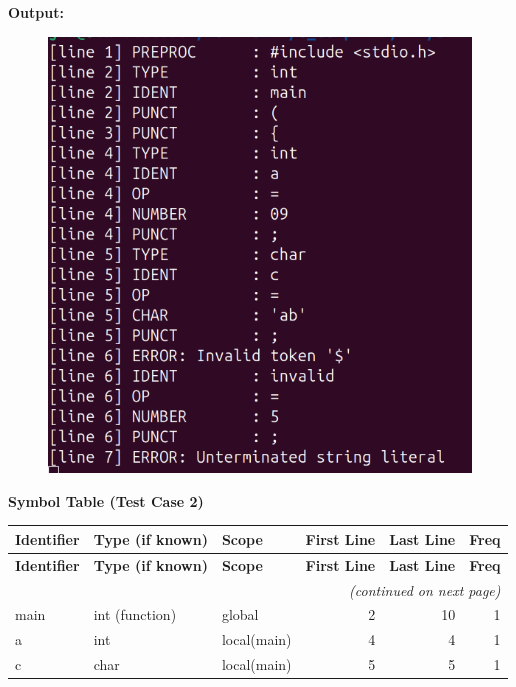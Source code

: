 \documentclass[12pt,a4paper]{article}
\begin{document}
\textbf{Output:}
\begin{figure}[H]
    \centering
    \includegraphics[width=0.9\linewidth]{errors.png}
\end{figure}

\noindent\textbf{Symbol Table (Test Case 2)}
\begin{center}
\begin{longtable}{@{} l l l r r r @{}}\toprule
\textbf{Identifier} & \textbf{Type (if known)} & \textbf{Scope} &
\textbf{First Line} & \textbf{Last Line} & \textbf{Freq} \\
\midrule
\endfirsthead
\toprule
\textbf{Identifier} & \textbf{Type (if known)} & \textbf{Scope} &
\textbf{First Line} & \textbf{Last Line} & \textbf{Freq} \\
\midrule
\endhead
\midrule \multicolumn{6}{r}{\emph{(continued on next page)}}\\
\midrule
\endfoot
\bottomrule
\endlastfoot
main          & int (function)  & global       & 2 & 10 & 1 \\
a             & int             & local(main)  & 4 & 4  & 1 \\
c             & char            & local(main)  & 5 & 5  & 1 \\
\end{longtable}
\end{center}
\end{document}
